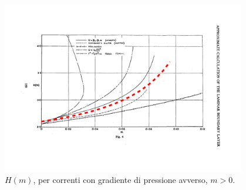 \begin{figure}[h!]
\centering
 \includegraphics[width=0.95\textwidth, trim= 0  90 0 100, clip]{./../template/fig/cfr_H_m_pos}
\caption{$H(m)$, per correnti con gradiente di pressione avverso, $m>0$.}\label{fig:H_m_pos}
\end{figure}


